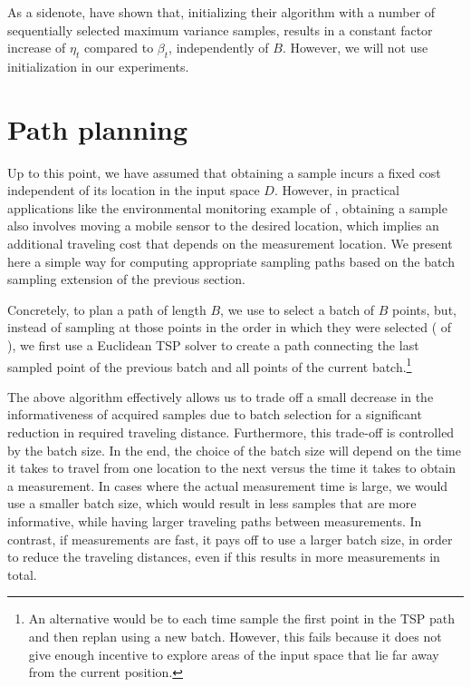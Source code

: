 As a sidenote, \citet{desautels12} have shown that,
initializing their \gpbucb algorithm with a number of sequentially selected
maximum variance samples, results in a constant factor increase of $\eta_t$
compared to $\beta_t$, independently of $B$.
However, we will not use initialization in our experiments.

\section{Path planning} \label{sect:pp}
Up to this point, we have assumed that obtaining a sample incurs a fixed
cost independent of its location in the input space $D$. However, in practical
applications like the environmental monitoring example of ,
obtaining a sample also involves moving a mobile sensor to the desired
location, which implies an additional traveling cost that depends on the
measurement location. We present here a simple way for
computing appropriate sampling paths based on the batch sampling
extension of the previous section.

Concretely, to plan a path of length $B$, we use \bacl to select a batch of
$B$ points, but, instead of sampling at those points in the order in which
they were selected
( of ), we first use a
Euclidean TSP solver to create a path connecting the last sampled point of
the previous batch and all points of the current
batch.\footnote{An alternative would be to each time sample the first
point in the TSP path and then replan using a new batch. However, this fails
because it does not give enough incentive to explore areas of the input space
that lie far away from the current position.}

The above algorithm effectively allows us to trade off a small decrease in
the informativeness of acquired samples due to batch selection for a
significant reduction in required traveling distance. Furthermore, this
trade-off is controlled by the batch size. In the end, the choice of the
batch size will depend on the time it takes to travel from one location
to the next versus the time it takes to obtain a measurement. In cases
where the actual measurement time is large, we would use a smaller
batch size, which would result in less samples that are more informative,
while having larger traveling paths between measurements.
In contrast, if measurements are fast, it pays off to use a larger batch
size, in order to reduce the traveling distances, even if this results
in more measurements in total.

